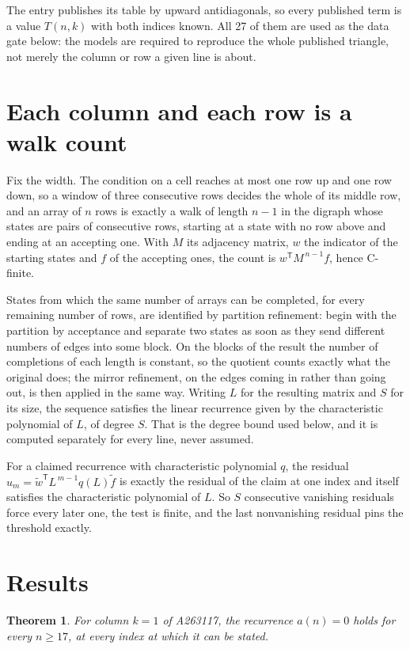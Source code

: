 \documentclass[11pt]{article}
\newtheorem{theorem}{Theorem}
\theoremstyle{definition}
\begin{document}
The entry publishes its table by upward antidiagonals, so every published term is a value $T(n,k)$ with both indices known. All 27 of them are used as the data gate below: the models are required to reproduce the whole published triangle, not merely the column or row a given line is about.

\section{Each column and each row is a walk count}

Fix the width. The condition on a cell reaches at most one row up and one row down, so a window of three consecutive rows decides the whole of its middle row, and an array of $n$ rows is exactly a walk of length $n-1$ in the digraph whose states are pairs of consecutive rows, starting at a state with no row above and ending at an accepting one. With $M$ its adjacency matrix, $w$ the indicator of the starting states and $f$ of the accepting ones, the count is $w^{\mathsf T}M^{\,n-1}f$, hence C-finite.

States from which the same number of arrays can be completed, for every remaining number of rows, are identified by partition refinement: begin with the partition by acceptance and separate two states as soon as they send different numbers of edges into some block. On the blocks of the result the number of completions of each length is constant, so the quotient counts exactly what the original does; the mirror refinement, on the edges coming in rather than going out, is then applied in the same way. Writing $L$ for the resulting matrix and $S$ for its size, the sequence satisfies the linear recurrence given by the characteristic polynomial of $L$, of degree $S$. That is the degree bound used below, and it is computed separately for every line, never assumed.

For a claimed recurrence with characteristic polynomial $q$, the residual $u_m = \tilde w^{\mathsf T}L^{\,m-1}q(L)\tilde f$ is exactly the residual of the claim at one index and itself satisfies the characteristic polynomial of $L$. So $S$ consecutive vanishing residuals force every later one, the test is finite, and the last nonvanishing residual pins the threshold exactly.

\section{Results}

\begin{theorem} For column $k = 1$ of A263117, the recurrence $a(n) = 0$ holds for every $n \ge 17$, at every index at which it can be stated.\end{theorem}
\end{document}

